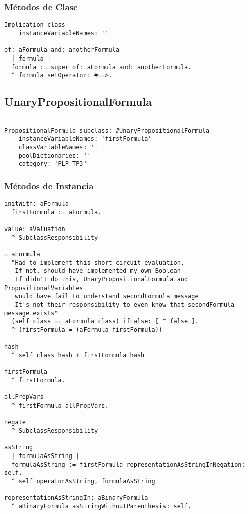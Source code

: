 \documentclass[spanish, 10pt,a4paper]{article}
\numberwithin{equation}{section} %
\begin{document}
\subsubsection{Métodos de Clase}

\begin{lstlisting}
Implication class
	instanceVariableNames: ''

of: aFormula and: anotherFormula
  | formula |
  formula := super of: aFormula and: anotherFormula.
  ^ formula setOperator: #==>.

\end{lstlisting}

\subsection{UnaryPropositionalFormula}

\begin{lstlisting}

PropositionalFormula subclass: #UnaryPropositionalFormula
	instanceVariableNames: 'firstFormula'
	classVariableNames: ''
	poolDictionaries: ''
	category: 'PLP-TP3'
\end{lstlisting}

\subsubsection{Métodos de Instancia}

\begin{lstlisting}
initWith: aFormula
  firstFormula := aFormula.

value: aValuation
  ^ SubclassResponsibility

= aFormula
  "Had to implement this short-circuit evaluation. 
   If not, should have implemented my own Boolean
   If didn't do this, UnaryPropositionalFormula and PropositionalVariables 
   would have fail to understand secondFormula message
   It's not their responsibility to even know that secondFormula message exists"
  (self class == aFormula class) ifFalse: [ ^ false ].
  ^ (firstFormula = (aFormula firstFormula))

hash 
  ^ self class hash + firstFormula hash

firstFormula
  ^ firstFormula.

allPropVars
  ^ firstFormula allPropVars.

negate
  ^ SubclassResponsibility

asString
  | formulaAsString |
  formulaAsString := firstFormula representationAsStringInNegation: self.
  ^ self operatorAsString, formulaAsString

representationAsStringIn: aBinaryFormula
  ^ aBinaryFormula asStringWithoutParenthesis: self.

\end{lstlisting}
\end{document}
